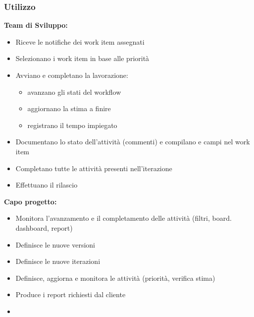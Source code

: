 \subsubsection{Utilizzo}
\begin{multicols}{2}
    \raggedright
    \textbf{Team di Sviluppo:}
    \begin{itemize}
        \item Riceve le notifiche dei work item assegnati
        \item Selezionano i work item in base alle priorità
        \item Avviano e completano la lavorazione:
        \begin{itemize}
            \item avanzano gli stati del workflow
            \item aggiornano la stima a finire
            \item registrano il tempo impiegato
        \end{itemize} 
        \item Documentano lo stato dell’attività (commenti) e compilano e campi nel work item
        \item Completano tutte le attività presenti nell'iterazione
        \item Effettuano il rilascio
    \end{itemize}
    \columnbreak
    \textbf{Capo progetto:}
    \begin{itemize}
        \item Monitora l’avanzamento e il completamento delle attività (filtri, board. dashboard, report)
        \item Definisce le nuove versioni
        \item Definisce le nuove iterazioni
        \item Definisce, aggiorna e monitora le attività (priorità, verifica stima)
        \item Produce i report richiesti dal cliente
        \item[]
    \end{itemize}
\end{multicols}

\newpage